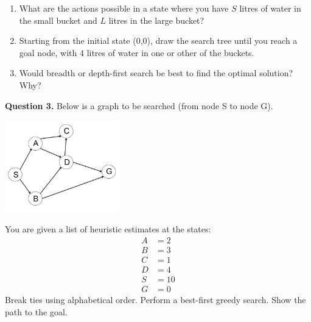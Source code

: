 \documentclass[a4paper,12pt]{article}
\begin{document}
\begin{enumerate}
    \item What are the actions possible in a state where you have $S$ litres of water in the small bucket and $L$ litres in the large bucket?
    \item Starting from the initial state (0,0), draw the search tree until you reach a goal node, with 4 litres of water in one or other of the buckets.
    \item Would breadth or depth-first search be best to find the optimal solution? Why?
\end{enumerate}

\noindent \textbf{Question 3.} Below is a graph to be searched (from node S to node G).
\begin{center}
\includegraphics[width=5cm]{w6_q3_fig.png}
\end{center}

You are given a list of heuristic estimates at the states:
\begin{align*}
    A &= 2 \\
    B &= 3 \\
    C &= 1 \\
    D &= 4 \\
    S &= 10 \\
    G &= 0
\end{align*}
Break ties using alphabetical order. Perform a best-first greedy search. Show the path to the goal.\\[1 cm]
\end{document}
